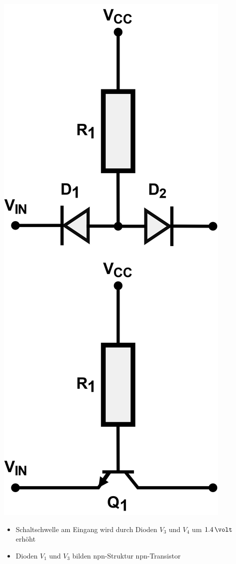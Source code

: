 \begin{minipage}[c]{0.11\columnwidth}
    \includegraphics[width=\columnwidth]{images/dtl_diodes_transistor.png}
\end{minipage}
\hfill
\begin{minipage}[c]{0.48\columnwidth}
    \begin{itemize}
        \item  Schaltschwelle am Eingang wird durch Dioden $V_3$ und $V_4$ um $1.4 \, \volt$ erhöht
        \item Dioden $V_1$ und $V_3$ bilden npn-Struktur \textrightarrow npn-Transistor
    \end{itemize}
\end{minipage}

